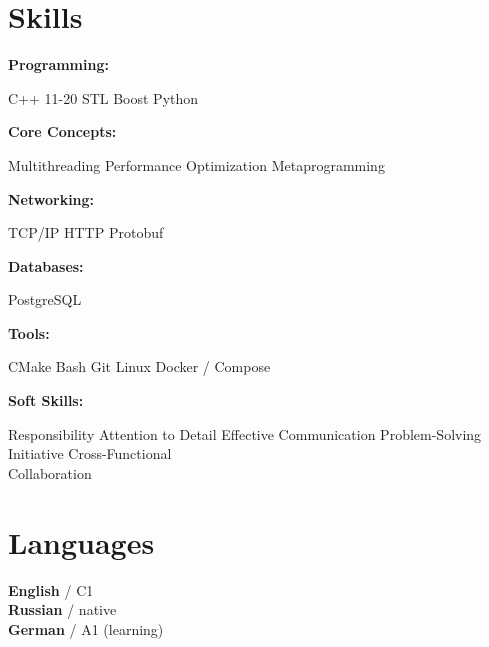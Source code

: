 \documentclass[]{deedy-resume}
\begin{document}
\begin{minipage}[t]{0.25\textwidth}


\section{Skills}

\textbf{Programming:}
\begin{skillitemize}
    \skillitem C++ 11-20
    \skillitem STL
    \skillitem Boost
    \skillitem Python
\end{skillitemize}
\halfspace

\textbf{Core Concepts:}
\begin{skillitemize}
    \skillitem Multithreading
    \skillitem Performance Optimization
    \skillitem Metaprogramming
\end{skillitemize}
\halfspace

\textbf{Networking:}
\begin{skillitemize}
    \skillitem TCP/IP
    \skillitem HTTP
    \skillitem Protobuf
\end{skillitemize}
\halfspace

\textbf{Databases:}
\begin{skillitemize}
    \skillitem PostgreSQL
\end{skillitemize}
\halfspace

\textbf{Tools:}
\begin{skillitemize}
    \skillitem CMake
    \skillitem Bash
    \skillitem Git
    \skillitem Linux
    \skillitem Docker / Compose
\end{skillitemize}
\halfspace

\textbf{Soft Skills:}
\begin{skillitemize}
    \skillitem Responsibility
    \skillitem Attention to Detail
    \skillitem Effective Communication
    \skillitem Problem-Solving
    \skillitem Initiative
    \skillitem Cross-Functional \\ Collaboration
\end{skillitemize}

\sectionspace


\section{Languages}
\textbf{English} / C1 \\
\textbf{Russian} / native \\
\textbf{German} / A1 (learning)


\end{minipage}
\end{document}
